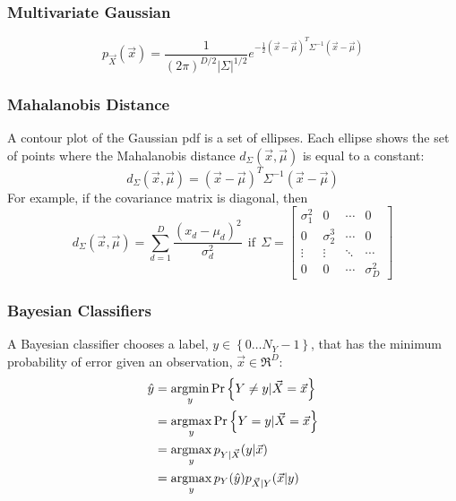 \documentclass{beamer}
\newcommand{\argmax}{\operatornamewithlimits{argmax}}
\newcommand{\argmin}{\operatornamewithlimits{argmin}}
\begin{document}
\begin{frame}
  \frametitle{Multivariate Gaussian}

  \begin{displaymath}
    p_{\vec{X}}(\vec{x})=\frac{1}{(2\pi)^{D/2}|\Sigma|^{1/2}}
    e^{-\frac{1}{2}(\vec{x}-\vec\mu)^T\Sigma^{-1}(\vec{x}-\vec\mu)}
  \end{displaymath}
\end{frame}

\begin{frame}
  \frametitle{Mahalanobis Distance}

  A contour plot of the Gaussian pdf is a set of ellipses.  Each
  ellipse shows the set of points where the Mahalanobis distance
  $d_\Sigma(\vec{x},\vec\mu)$ is equal to a  constant:
  \begin{displaymath}
    d_\Sigma(\vec{x},\vec\mu) = (\vec{x}-\vec\mu)^T\Sigma^{-1}(\vec{x}-\vec\mu)
  \end{displaymath}
  For example, if the covariance matrix is diagonal, then
  \begin{displaymath}
    d_\Sigma(\vec{x},\vec\mu) = \sum_{d=1}^D\frac{(x_d-\mu_d)^2}{\sigma_d^2}~~\mbox{if}~~
    \Sigma=\left[\begin{array}{cccc}
        \sigma_1^2&0&\cdots&0\\
        0&\sigma_2^3&\cdots&0\\
        \vdots&\vdots&\ddots&\cdots\\
        0&0&\cdots&\sigma_D^2\end{array}
        \right]
  \end{displaymath}
\end{frame}

\begin{frame}
  \frametitle{Bayesian Classifiers}
  
  A Bayesian classifier chooses a label, $y\in\left\{0\ldots N_Y-1\right\}$, that has
    the minimum probability of error given an observation,
    $\vec{x}\in\Re^D$:
  \begin{align*}
    \hat{y} &= \argmin_{y} \Pr\left\{Y \ne y|\vec{X}=\vec{x}\right\}\\
    &= \argmax_{y} \Pr\left\{Y = y|\vec{X}=\vec{x}\right\}\\
    &= \argmax_{y} p_{Y|\vec{X}}(y|\vec{x})\\
    &= \argmax_{y} p_Y(\hat{y}) p_{\vec{X}|Y}(\vec{x}|y)
  \end{align*}
\end{frame}
\end{document}
